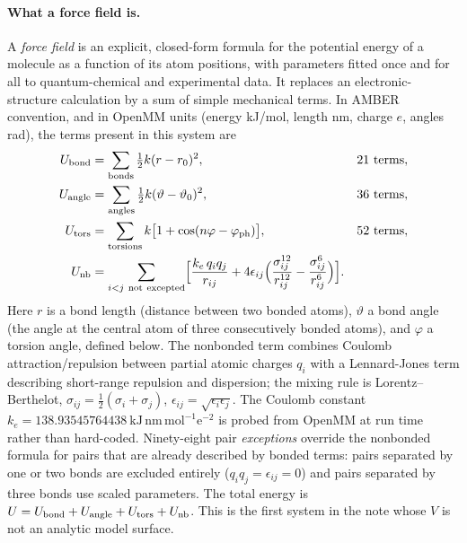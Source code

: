 \documentclass[11pt]{article}
\begin{document}
\paragraph{What a force field is.}
A \emph{force field} is an explicit, closed-form formula for the potential
energy of a molecule as a function of its atom positions, with parameters
fitted once and for all to quantum-chemical and experimental data.  It replaces
an electronic-structure calculation by a sum of simple mechanical terms.  In
AMBER convention, and in OpenMM units (energy kJ/mol, length nm, charge $e$,
angles rad), the terms present in this system are
\begin{align}
 U_{\rm bond}   &=\sum_{\rm bonds}\tfrac12k(r-r_0)^2, &&\text{$21$ terms},\\
 U_{\rm angle}  &=\sum_{\rm angles}\tfrac12k(\vartheta-\vartheta_0)^2,
   &&\text{$36$ terms},\\
 U_{\rm tors}   &=\sum_{\rm torsions}k\bigl[1+\cos(n\varphi-\varphi_{\rm ph})\bigr],
   &&\text{$52$ terms},\\
 U_{\rm nb}     &=\sum_{i<j\ \rm not\ excepted}
   \Bigl[\frac{k_e\,q_iq_j}{r_{ij}}
   +4\epsilon_{ij}\Bigl(\frac{\sigma_{ij}^{12}}{r_{ij}^{12}}
   -\frac{\sigma_{ij}^{6}}{r_{ij}^{6}}\Bigr)\Bigr].
\end{align}
Here $r$ is a bond length (distance between two bonded atoms), $\vartheta$ a
bond angle (the angle at the central atom of three consecutively bonded atoms),
and $\varphi$ a torsion angle, defined below.  The nonbonded term combines
Coulomb attraction/repulsion between partial atomic charges $q_i$ with a
Lennard-Jones term describing short-range repulsion and dispersion; the mixing
rule is Lorentz--Berthelot,
$\sigma_{ij}=\tfrac12(\sigma_i+\sigma_j)$,
$\epsilon_{ij}=\sqrt{\epsilon_i\epsilon_j}$.  The Coulomb constant
$k_{e}=138.93545764438\ \mathrm{kJ\,nm\,mol^{-1}e^{-2}}$ is probed from OpenMM
at run time rather than hard-coded.  Ninety-eight pair \emph{exceptions}
override the nonbonded formula for pairs that are already described by bonded
terms: pairs separated by one or two bonds are excluded entirely
($q_iq_j=\epsilon_{ij}=0$) and pairs separated by three bonds use scaled
parameters.  The total energy is
$U=U_{\rm bond}+U_{\rm angle}+U_{\rm tors}+U_{\rm nb}$.  This is the first
system in the note whose $V$ is not an analytic model surface.
\end{document}
